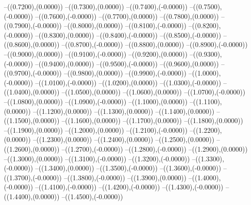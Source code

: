 {	--({\sx*(0.7200)},{\sy*(0.0000)})
	--({\sx*(0.7300)},{\sy*(0.0000)})
	--({\sx*(0.7400)},{\sy*(-0.0000)})
	--({\sx*(0.7500)},{\sy*(-0.0000)})
	--({\sx*(0.7600)},{\sy*(-0.0000)})
	--({\sx*(0.7700)},{\sy*(0.0000)})
	--({\sx*(0.7800)},{\sy*(0.0000)})
	--({\sx*(0.7900)},{\sy*(-0.0000)})
	--({\sx*(0.8000)},{\sy*(0.0000)})
	--({\sx*(0.8100)},{\sy*(-0.0000)})
	--({\sx*(0.8200)},{\sy*(-0.0000)})
	--({\sx*(0.8300)},{\sy*(0.0000)})
	--({\sx*(0.8400)},{\sy*(-0.0000)})
	--({\sx*(0.8500)},{\sy*(-0.0000)})
	--({\sx*(0.8600)},{\sy*(0.0000)})
	--({\sx*(0.8700)},{\sy*(-0.0000)})
	--({\sx*(0.8800)},{\sy*(0.0000)})
	--({\sx*(0.8900)},{\sy*(-0.0000)})
	--({\sx*(0.9000)},{\sy*(0.0000)})
	--({\sx*(0.9100)},{\sy*(-0.0000)})
	--({\sx*(0.9200)},{\sy*(0.0000)})
	--({\sx*(0.9300)},{\sy*(-0.0000)})
	--({\sx*(0.9400)},{\sy*(0.0000)})
	--({\sx*(0.9500)},{\sy*(-0.0000)})
	--({\sx*(0.9600)},{\sy*(0.0000)})
	--({\sx*(0.9700)},{\sy*(-0.0000)})
	--({\sx*(0.9800)},{\sy*(0.0000)})
	--({\sx*(0.9900)},{\sy*(-0.0000)})
	--({\sx*(1.0000)},{\sy*(-0.0000)})
	--({\sx*(1.0100)},{\sy*(-0.0000)})
	--({\sx*(1.0200)},{\sy*(0.0000)})
	--({\sx*(1.0300)},{\sy*(-0.0000)})
	--({\sx*(1.0400)},{\sy*(0.0000)})
	--({\sx*(1.0500)},{\sy*(0.0000)})
	--({\sx*(1.0600)},{\sy*(0.0000)})
	--({\sx*(1.0700)},{\sy*(-0.0000)})
	--({\sx*(1.0800)},{\sy*(0.0000)})
	--({\sx*(1.0900)},{\sy*(-0.0000)})
	--({\sx*(1.1000)},{\sy*(0.0000)})
	--({\sx*(1.1100)},{\sy*(0.0000)})
	--({\sx*(1.1200)},{\sy*(0.0000)})
	--({\sx*(1.1300)},{\sy*(0.0000)})
	--({\sx*(1.1400)},{\sy*(0.0000)})
	--({\sx*(1.1500)},{\sy*(0.0000)})
	--({\sx*(1.1600)},{\sy*(0.0000)})
	--({\sx*(1.1700)},{\sy*(0.0000)})
	--({\sx*(1.1800)},{\sy*(0.0000)})
	--({\sx*(1.1900)},{\sy*(0.0000)})
	--({\sx*(1.2000)},{\sy*(0.0000)})
	--({\sx*(1.2100)},{\sy*(-0.0000)})
	--({\sx*(1.2200)},{\sy*(0.0000)})
	--({\sx*(1.2300)},{\sy*(0.0000)})
	--({\sx*(1.2400)},{\sy*(0.0000)})
	--({\sx*(1.2500)},{\sy*(0.0000)})
	--({\sx*(1.2600)},{\sy*(0.0000)})
	--({\sx*(1.2700)},{\sy*(-0.0000)})
	--({\sx*(1.2800)},{\sy*(-0.0000)})
	--({\sx*(1.2900)},{\sy*(0.0000)})
	--({\sx*(1.3000)},{\sy*(0.0000)})
	--({\sx*(1.3100)},{\sy*(-0.0000)})
	--({\sx*(1.3200)},{\sy*(-0.0000)})
	--({\sx*(1.3300)},{\sy*(-0.0000)})
	--({\sx*(1.3400)},{\sy*(0.0000)})
	--({\sx*(1.3500)},{\sy*(-0.0000)})
	--({\sx*(1.3600)},{\sy*(-0.0000)})
	--({\sx*(1.3700)},{\sy*(-0.0000)})
	--({\sx*(1.3800)},{\sy*(-0.0000)})
	--({\sx*(1.3900)},{\sy*(0.0000)})
	--({\sx*(1.4000)},{\sy*(-0.0000)})
	--({\sx*(1.4100)},{\sy*(-0.0000)})
	--({\sx*(1.4200)},{\sy*(-0.0000)})
	--({\sx*(1.4300)},{\sy*(-0.0000)})
	--({\sx*(1.4400)},{\sy*(0.0000)})
	--({\sx*(1.4500)},{\sy*(-0.0000)})
}
